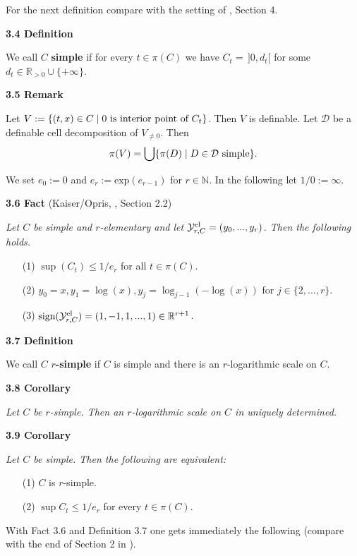 \documentclass[12pt]{article}
\def\vs{\vspace}
\def\exp{\mathrm{exp}}
\def\ma{\mathcal}
\begin{document}
\vs{0.3cm}
For the next definition compare with the setting of \cite{5}, Section 4.

\vs{0.5cm}
{\bf3.4 Definition}

\vs{0.1cm}
We call $C$ {\bf simple} if for every $t \in \pi(C)$ we have $C_t=\,]0,d_t[$ for some $d_t \in \mathbb{R}_{>0} \cup \{+\infty\}$.

\vs{0.5cm}
{\bf3.5 Remark}

\vs{0.1cm}
Let $V:=\{(t,x) \in C \mid 0 \textnormal{ is interior point of }C_t\}$. Then $V$ is definable. Let $\mathcal{D}$ be a definable cell decomposition of $V_{\neq 0}$. Then
$$\pi(V)=\bigcup\{\pi(D) \mid D \in \mathcal{D} \textnormal{ simple}\}.$$

\vs{0.5cm}
We set $e_0:=0$ and $e_r:=\exp(e_{r-1})$ for $r\in \mathbb{N}$. In the following let $1/0:=\infty$.

\vs{0.5cm}
{\bf3.6 Fact} (Kaiser/Opris, \cite{7}, Section 2.2)

\vs{0.1cm}
{\it Let $C$ be simple and $r$-elementary and let $\ma{Y}_{r,C}^{\textnormal{el}}=(y_0,...,y_r)$. Then the following holds.
	\begin{itemize}
		\item[(1)] $\sup(C_t) \leq 1/e_r$ for all $t \in \pi(C)$. 
		\item[(2)] $y_0=x,y_1=\log(x), y_j=\log_{j-1}(-\log(x))$ for $j \in \{2,...,r\}$.
		\item[(3)] $\textnormal{sign}(\mathcal{Y}_{r,C}^{\textnormal{el}})=(1,-1,1,...,1) \in \mathbb{R}^{r+1}$.
\end{itemize}}

\vs{0.4cm}
{\bf3.7 Definition}

\vs{0.1cm}
We call $C$ \textbf{$r$-simple} if $C$ is simple and there is an $r$-logarithmic scale on $C$.

\vs{0.5cm}
{\bf3.8 Corollary}

\vs{0.1cm}
{\it Let $C$ be $r$-simple. Then an $r$-logarithmic scale on $C$ in uniquely determined.}

\vs{0.5cm}
{\bf3.9 Corollary}

\vs{0.1cm}
{\it Let $C$ be simple. Then the following are equivalent:
\begin{itemize}
	\item [(1)]
	$C$ is $r$-simple.
	\item [(2)] 
	$\sup C_t \leq 1/e_r$ for every $t \in \pi(C)$. 
\end{itemize}}

\vs{0.3cm}
With Fact 3.6 and Definition 3.7 one gets immediately the following (compare with the end of Section 2 in \cite{10}).
\end{document}
